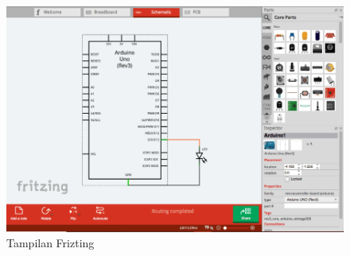 \begin{enumerate}
\begin{figure}[H]
\centering
\includegraphics[width=1\textwidth]{figures/frizting2.png}
\caption{Tampilan Frizting  }
\label{print}
\end{figure}


\end{enumerate}
